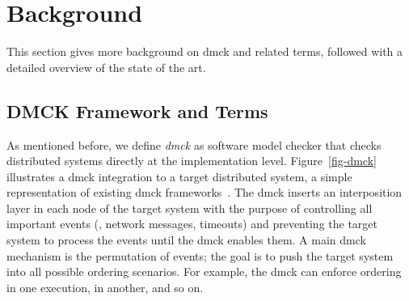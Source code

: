 
\section{Background}
\label{sec-mot}

This section gives more background on dmck and related terms,
followed with a detailed overview of the state of the art.  



\subsection{DMCK Framework and Terms}
\label{mot-bgterms}


As mentioned before, we define {\em dmck} as  software model checker
that checks distributed systems directly at the implementation level.
Figure~\ref{fig-dmck} illustrates a dmck integration to a target
distributed system, a simple representation of existing dmck
frameworks~\cite{Guo+11-Demeter, Killian+07-LifeDeathMaceMC,
  Simsa+10-Dbug, Yang+09-Modist}.  The dmck inserts an interposition
layer in each node of the target system with the purpose of
controlling all important events (\eg, network messages, timeouts) and
preventing the target system to process the events until the dmck
enables them.  A main dmck mechanism is the permutation of events; the
goal is to push the target system into all possible ordering scenarios.
For example, the dmck can enforce  ordering in one execution,
 in another, and so on.



